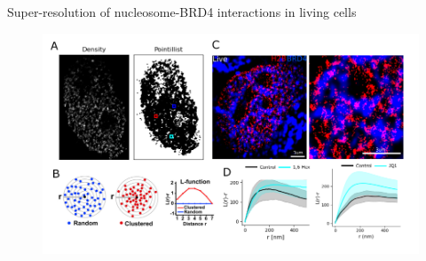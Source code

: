 \documentclass{beamer}					%
\begin{document}
\begin{frame}{Super-resolution of nucleosome-BRD4 interactions in living cells}
\begin{figure}
\includegraphics[width=13cm]{BRD4-Results.png}
\end{figure}
\end{frame}

\end{document}
